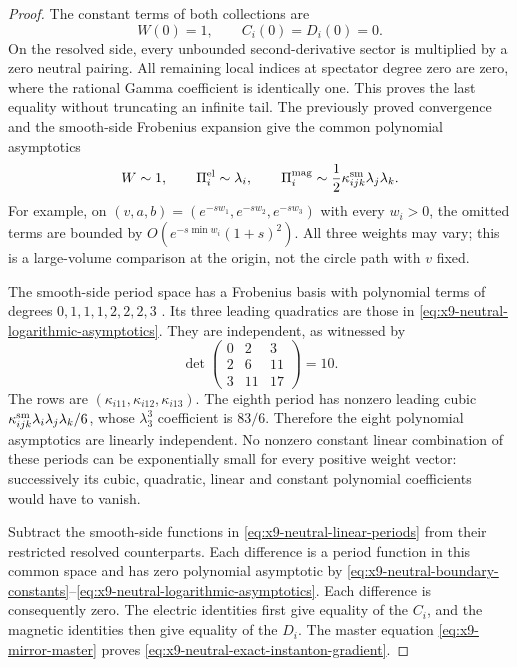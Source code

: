 \begin{proof}
The constant terms of both collections are
\begin{equation}
 W(0)=1,\qquad C_i(0)=D_i(0)=0.
 \label{eq:x9-neutral-boundary-constants}
\end{equation}
On the resolved side, every unbounded second-derivative sector
is multiplied by a zero neutral pairing. All remaining local
indices at spectator degree zero are zero, where the rational
Gamma coefficient is identically one. This proves the last
equality without truncating an infinite tail. The previously
proved convergence and the smooth-side Frobenius expansion give
the common polynomial asymptotics
\begin{equation}
 W\sim1,\qquad \Pi^{\rm el}_i\sim\lambda_i,\qquad
 \Pi^{\rm mag}_i\sim\frac12\kappa^{\rm sm}_{ijk}
                                  \lambda_j\lambda_k.
 \label{eq:x9-neutral-logarithmic-asymptotics}
\end{equation}
For example, on $(v,a,b)=(e^{-s w_1},e^{-s w_2},e^{-s w_3})$
with every $w_i>0$, the omitted terms are bounded by
$O(e^{-s\min w_i}(1+s)^2)$. All three weights may vary; this
is a large-volume comparison at the origin, not the circle
path with $v$ fixed.

The smooth-side period space has a Frobenius basis with polynomial
terms of degrees $0,1,1,1,2,2,2,3$
\cite[Equations~(4.15)--(4.19)]{Demirtas:2024Mirror}.
Its three leading quadratics are those in
\eqref{eq:x9-neutral-logarithmic-asymptotics}. They are independent,
as witnessed by
\begin{equation}
 \det\begin{pmatrix}0&2&3\\2&6&11\\3&11&17\end{pmatrix}=10.
 \label{eq:x9-neutral-logarithmic-minor}
\end{equation}
The rows are $(\kappa_{i11},\kappa_{i12},\kappa_{i13})$.
The eighth period has nonzero leading cubic
$\kappa^{\rm sm}_{ijk}\lambda_i\lambda_j\lambda_k/6$,
whose $\lambda_3^3$ coefficient is $83/6$.
Therefore the eight polynomial asymptotics are linearly independent.
No nonzero constant linear combination of these periods can be
exponentially small for every positive weight vector: successively
its cubic, quadratic, linear and constant polynomial coefficients
would have to vanish.

Subtract the smooth-side functions in
\eqref{eq:x9-neutral-linear-periods} from their restricted resolved
counterparts. Each difference is a period function in this common
space and has zero polynomial asymptotic by
\eqref{eq:x9-neutral-boundary-constants}--\eqref{eq:x9-neutral-logarithmic-asymptotics}.
Each difference is consequently zero. The electric identities first
give equality of the $C_i$, and the magnetic identities then give
equality of the $D_i$. The master equation
\eqref{eq:x9-mirror-master} proves
\eqref{eq:x9-neutral-exact-instanton-gradient}.
\end{proof}

